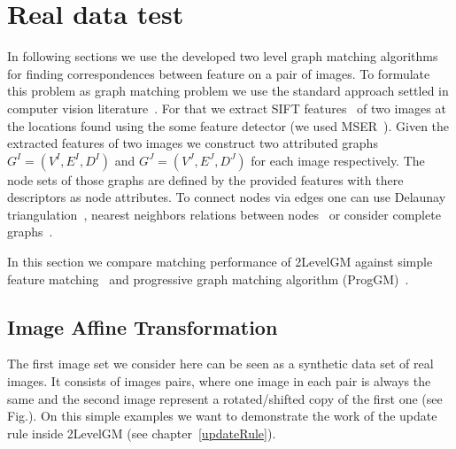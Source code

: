 \section{Real data test}
In following sections we use the developed two level graph matching algorithms for finding correspondences between feature on a pair of images. To formulate this problem as graph matching problem we use the standard approach settled in computer vision literature~\cite{Cho2010_RRWM,Cho2012_ProgressiveGM,FastPFP,Hancock_EM_SVD,Hancock_GM_SpectralPart}. For that we extract SIFT features~\cite{Lowe2004} of two images at the locations found using the some feature detector (we used  MSER~\cite{MSER}). Given the extracted features of two images we construct two attributed graphs $G^I=(V^I,E^I,D^I)$ and $G^J=(V^J,E^J,D^J)$ for each image respectively. The node sets of those graphs are defined by the provided features with there descriptors as node attributes. To connect nodes via edges one can use Delaunay triangulation~\cite{Hancock_EM_SVD,Hancock_GM_SpectralPart}, nearest neighbors relations between nodes~\cite{Sanrom2012} or consider complete graphs~\cite{Cho2012_ProgressiveGM,Cho2014_Haystack}.

In this section we compare matching performance of 2LevelGM against simple feature matching~\cite{Lowe2004} and progressive graph matching algorithm (ProgGM)~\cite{Cho2012_ProgressiveGM}. 

\subsection{Image Affine Transformation}
The first image set we consider here can be seen as a synthetic data set of real images. It consists of images pairs, where one image in each pair is always the same and the second image represent a rotated/shifted copy of the first one (see Fig.). On this simple examples we want to demonstrate the work of the update rule inside 2LevelGM (see chapter~\ref{updateRule}).


